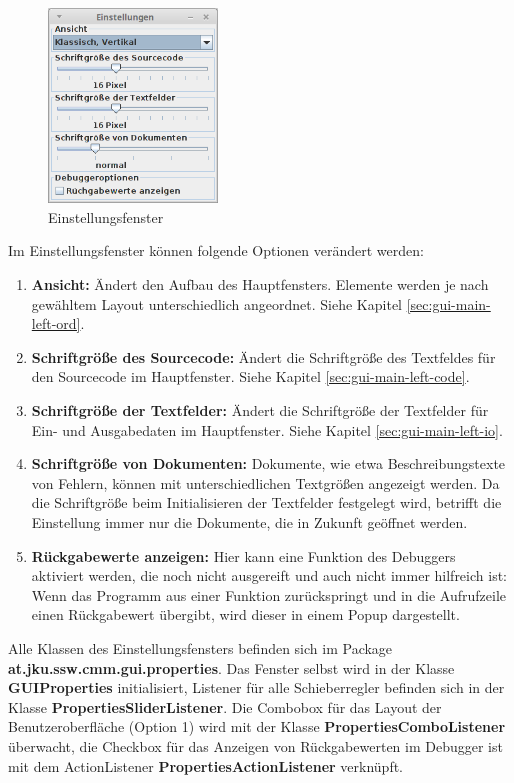 \begin{figure}[htp]
\centering
\includegraphics[width=0.4\textwidth]{./media/images/gui/elements/Bildschirmfoto-Einstellungen.png}
\caption{Einstellungsfenster}
\label{fig:win-set}
\end{figure}

Im Einstellungsfenster können folgende Optionen verändert werden:
\begin{enumerate}
\item \textbf{Ansicht:} Ändert den Aufbau des Hauptfensters. Elemente werden je nach gewähltem Layout unterschiedlich angeordnet. Siehe Kapitel \ref{sec:gui-main-left-ord}.
\item \textbf{Schriftgröße des Sourcecode:} Ändert die Schriftgröße des Textfeldes für den Sourcecode im Hauptfenster. Siehe Kapitel \ref{sec:gui-main-left-code}.
\item \textbf{Schriftgröße der Textfelder:} Ändert die Schriftgröße der Textfelder für Ein- und Ausgabedaten im Hauptfenster. Siehe Kapitel \ref{sec:gui-main-left-io}.
\item \textbf{Schriftgröße von Dokumenten:} Dokumente, wie etwa Beschreibungstexte von Fehlern, können mit unterschiedlichen Textgrößen angezeigt werden. Da die Schriftgröße beim Initialisieren der Textfelder festgelegt wird, betrifft die Einstellung immer nur die Dokumente, die in Zukunft geöffnet werden.
\item \textbf{Rückgabewerte anzeigen:} Hier kann eine Funktion des Debuggers aktiviert werden, die noch nicht ausgereift und auch nicht immer hilfreich ist: Wenn das Programm aus einer Funktion zurückspringt und in die Aufrufzeile einen Rückgabewert übergibt, wird dieser in einem Popup dargestellt.
\end{enumerate}

Alle Klassen des Einstellungsfensters befinden sich im Package \textbf{at.jku.ssw.cmm.gui.properties}. Das Fenster selbst wird in der Klasse \textbf{GUIProperties} initialisiert, Listener für alle Schieberregler befinden sich in der Klasse \textbf{PropertiesSliderListener}. Die Combobox für das Layout der Benutzeroberfläche (Option 1) wird mit der Klasse \textbf{PropertiesComboListener} überwacht, die Checkbox für das Anzeigen von Rückgabewerten im Debugger ist mit dem ActionListener \textbf{PropertiesActionListener} verknüpft.

